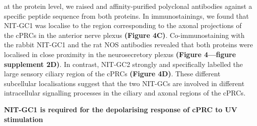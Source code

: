 \documentclass[
  10pt,
  onecolumn]{article}
\begin{document}
at the protein level, we raised and affinity-purified polyclonal
antibodies against a specific peptide sequence from both proteins. In
immunostainings, we found that NIT-GC1 was localise to the region
corresponding to the axonal projections of the cPRCs in the anterior
nerve plexus \textbf{(Figure 4C)}. Co-immunostaining with the rabbit
NIT-GC1 and the rat NOS antibodies revealed that both proteins were
localised in close proximity in the neurosecretory plexus
\textbf{(Figure 4---figure supplement 2D)}. In contrast, NIT-GC2
strongly and specifically labelled the large sensory ciliary region of
the cPRCs \textbf{(Figure 4D)}. These different subcellular
localisations suggest that the two NIT-GCs are involved in different
intracellular signalling processes in the ciliary and axonal regions of
the cPRCs.

\textbf{NIT-GC1 is required for the depolarising response of cPRC to UV
stimulation}
\end{document}
